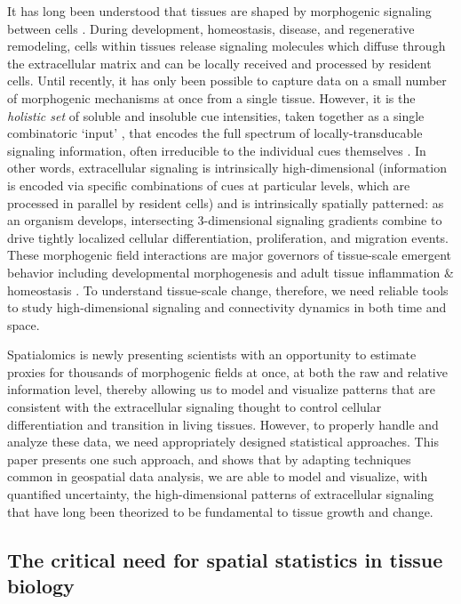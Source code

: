 \documentclass[10pt,letterpaper]{article}
\begin{document}
It has long been understood that tissues are shaped by morphogenic signaling between cells \cite{Vainio1997,Basson2012,Hagolani2019,Wu2023}. During development, homeostasis, disease, and regenerative remodeling, cells within tissues release signaling molecules which diffuse through the extracellular matrix and can be locally received and processed by resident cells. Until recently, it has only been possible to capture data on a small number of morphogenic mechanisms at once from a single tissue. However, it is the \textit{holistic set} of soluble and insoluble cue intensities, taken together as a single combinatoric `input' \cite{Li2019,Klumpe2022,Granados2024}, that encodes the full spectrum of locally-transducable signaling information, often irreducible to the individual cues themselves \cite{Brennan2012,Ellison2016,Scuderi2025}. In other words, extracellular signaling is intrinsically high-dimensional (information is encoded via specific combinations of cues at particular levels, which are processed in parallel by resident cells) and is intrinsically spatially patterned: as an organism develops, intersecting 3-dimensional signaling gradients combine to drive tightly localized cellular differentiation, proliferation, and migration events. These morphogenic field interactions are major governors of tissue-scale emergent behavior including developmental morphogenesis and adult tissue inflammation \& homeostasis \cite{Weaver1997,Hironaka2012,Meizlish2021,Kicheva2023}. To understand tissue-scale change, therefore, we need reliable tools to study high-dimensional signaling and connectivity dynamics in both time and space.

Spatialomics is newly presenting scientists with an opportunity to estimate proxies for thousands of morphogenic fields at once, at both the raw and relative information level, thereby allowing us to model and visualize patterns that are consistent with the extracellular signaling thought to control cellular differentiation and transition in living tissues. However, to properly handle and analyze these data, we need appropriately designed statistical approaches. This paper presents one such approach, and shows that by adapting techniques common in geospatial data analysis, we are able to model and visualize, with quantified uncertainty, the high-dimensional patterns of extracellular signaling that have long been theorized to be fundamental to tissue growth and change.

\subsection*{The critical need for spatial statistics in tissue biology}
\end{document}
